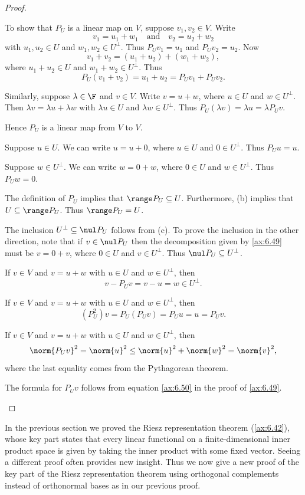 \begin{proof}\leavevmode
\begin{parts}
\item To show that $P_U$ is a linear map on $V$, suppose $v_1,v_2\in V$. Write
  \[ v_1=u_1+w_1 \quad\text{and}\quad v_2=u_2+w_2 \]
  with $u_1,u_2\in U$ and $w_1,w_2\in U^\perp$. Thus $P_Uv_1=u_1$ and
  $P_Uv_2=u_2$. Now
  \[ v_1+v_2 = (u_1+u_2)+(w_1+w_2), \]
  where $u_1+u_2\in U$ and $w_1+w_2\in U^\perp$. Thus
  \[ P_U(v_1+v_2) = u_1+u_2 = P_Uv_1+P_Uv_2. \]

  Similarly, suppose $\lambda\in\F$ and $v\in V$. Write $v=u+w$, where $u\in U$
  and $w\in U^\perp$. Then $\lambda v=\lambda u+\lambda w$ with
  $\lambda u\in U$ and $\lambda w\in U^\perp$. Thus
  $P_U(\lambda v)=\lambda u=\lambda P_Uv$.

  Hence $P_U$ is a linear map from $V$ to $V$.
\item Suppose $u\in U$. We can write $u=u+0$, where $u\in U$ and
  $0\in U^\perp$. Thus $P_Uu=u$.
\item Suppose $w\in U^\perp$. We can write $w=0+w$, where $0\in U$ and
  $w\in U^\perp$. Thus $P_Uw=0$.
\item The definition of $P_U$ implies that $\range P_U\subseteq U$.
  Furthermore, (b) implies that $U\subseteq\range P_U$. Thus $\range P_U=U$.
\item The inclusion $U^\perp\subseteq\nul P_U$ follows from (c). To prove the
  inclusion in the other direction, note that if $v\in\nul P_U$ then the
  decomposition given by \ref{ax:6.49} must be $v=0+v$, where $0\in U$ and
  $v\in U^\perp$. Thus $\nul P_U\subseteq U^\perp$.
\item If $v\in V$ and $v=u+w$ with $u\in U$ and $w\in U^\perp$, then
  \[ v-P_Uv = v-u = w\in U^\perp. \]
\item If $v\in V$ and $v=u+w$ with $u\in U$ and $w\in U^\perp$, then
  \[ (P_U^2)v = P_U(P_Uv) = P_Uu = u = P_Uv. \]
\item If $v\in V$ and $v=u+w$ with $u\in U$ and $w\in U^\perp$, then
  \[ \norm{P_Uv}^2 = \norm{u}^2 \le \norm{u}^2+\norm{w}^2 = \norm{v}^2, \]
  where the last equality comes from the Pythagorean theorem.
\item The formula for $P_Uv$ follows from equation \ref{ax:6.50} in the proof
  of \ref{ax:6.49}. \qedhere
\end{parts}
\end{proof}

In the previous section we proved the Riesz representation theorem
(\ref{ax:6.42}), whose key part states that every linear functional on a
finite-dimensional inner product space is given by taking the inner product
with some fixed vector. Seeing a different proof often provides new insight.
Thus we now give a new proof of the key part of the Riesz representation
theorem using orthogonal complements instead of orthonormal bases as in our
previous proof.

